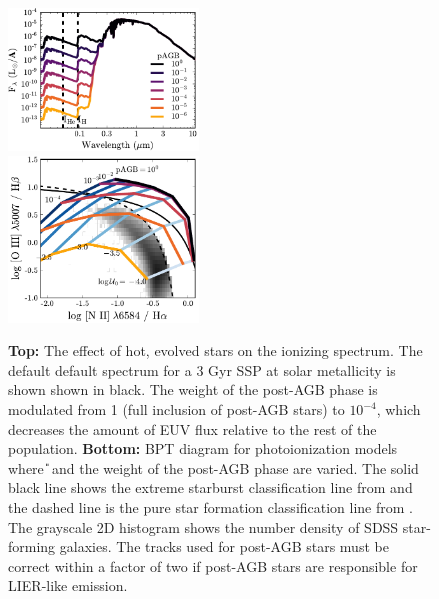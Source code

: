 \begin{figure}[!htbp]
  \begin{centering}
    \includegraphics[width=0.45\textwidth]{manuscript/chapter2/f28a.pdf}\\
    \includegraphics[width=0.45\textwidth]{manuscript/chapter2/f28b.pdf}
    \caption{\textbf{Top:} The effect of hot, evolved stars on the ionizing spectrum. The default default spectrum for a 3 Gyr SSP at solar metallicity is shown shown in black. The weight of the post-AGB phase is modulated from 1 (full inclusion of post-AGB stars) to $10^{-4}$, which decreases the amount of EUV flux relative to the rest of the population. \textbf{Bottom:} BPT diagram for photoionization models where \U{} and the weight of the post-AGB phase are varied. The solid black line shows the extreme starburst classification line from \citet{Kewley01} and the dashed line is the pure star formation classification line from \citet{Kauffmann03a}. The grayscale 2D histogram shows the number density of SDSS star-forming galaxies. The \citet{Vassiliadis} tracks used for post-AGB stars must be correct within a factor of two if post-AGB stars are responsible for LIER-like emission.}
    \label{fig:hotstars}
  \end{centering}
\end{figure}

